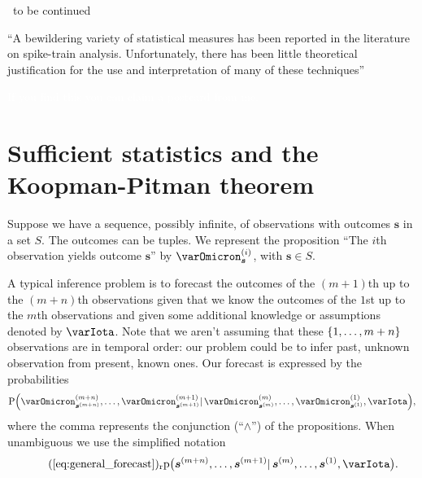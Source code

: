 \documentclass[\ifafour a4paper,12pt,\else a5paper,10pt,\fi%
onecolumn,oneside,article,%
british%
]{memoir}
\theoremstyle{remark}
\theoremstyle{innote}
\newcommand*{\citep}{\parencites}
\DeclarePairedDelimiter\set{\{}{\}}
\newcommand*{\pf}{\mathrm{p}}%
\newcommand*{\p}{\mathrm{P}}%
\renewcommand*{\|}{\mathpunct{|}}
\newcommand*{\labelbis}[1]{\tag*{(\ref{#1})$_\text{r}$}}
\newcommand*{\puzzle}{\maltese}
\newcommand{\mynote}[1]{ {\color{notecolour}\puzzle\ #1}}
\newcommand*{\yO}[2]{\varOmicron^{(#1)}_{#2}}
\newcommand*{\yI}{\varIota}
\newcommand*{\ys}{\bm{s}}
\newcommand*{\yso}[1]{\ys^{(#1)}}
\begin{document}
\mynote{to be continued}

\enquote{A bewildering variety of statistical measures has been reported in
  the literature on spike-train analysis. Unfortunately, there has been
  little theoretical justification for the use and interpretation of many
  of these techniques}  \citep[p.~494]{mooreetal1966}



\textcolor{white}{If you find this you can claim a postcard from me.}
%


\section{Sufficient statistics and the Koopman-Pitman theorem}
\label{sec:koopmanpitman}

Suppose we have a sequence, possibly infinite, of observations with
outcomes $\ys$ in a set $S$. The outcomes can be tuples. We represent the
proposition \enquote{The $i$th observation yields outcome $\ys$} by
$\yO{i}{\ys}$, with $\ys\in S$.

A typical inference problem is to forecast the outcomes of the $(m+1)$th up
to the $(m+n)$th observations given that we know the outcomes of the $1$st
up to the $m$th observations and given some additional knowledge or
assumptions denoted by $\yI$. Note that we aren't assuming that these
$\set{1,\dotsc,m+n}$ observations are in temporal order: our problem could be to
infer past, unknown observation from present, known ones. Our forecast is
expressed by the probabilities
\begin{equation}
  \label{eq:general_forecast}
  \p\Bigl(\yO{m+n}{\yso{m+n}}, \dotsc, \yO{m+1}{\yso{m+1}}
  \| \yO{m}{\yso{m}}, \dotsc, \yO{1}{\yso{1}}, \yI\Bigr),
\end{equation}
where the comma represents the conjunction (\enquote{$\land$}) of the
propositions. When unambiguous we use the simplified notation
\begin{equation}\labelbis{eq:general_forecast}
\pf\bigl(\yso{m+n}, \dotsc, \yso{m+1} \| \yso{m}, \dotsc, \yso{1}, \yI\bigr).
\end{equation}
\end{document}
